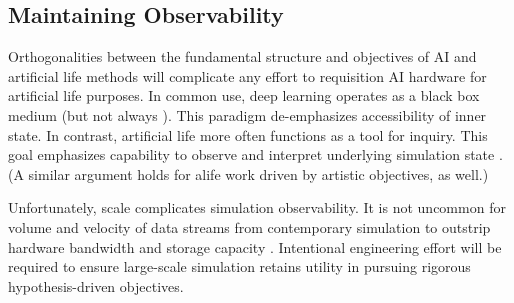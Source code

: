 \subsection{Maintaining Observability}

Orthogonalities between the fundamental structure and objectives of AI and artificial life methods will complicate any effort to requisition AI hardware for artificial life purposes.
In common use, deep learning operates as a black box medium \citep{loyola2019black} (but not always \citep{mahendran2015understanding}).
This paradigm de-emphasizes accessibility of inner state.
In contrast, artificial life more often functions as a tool for inquiry.
This goal emphasizes capability to observe and interpret underlying simulation state \citep{moreno2023toward,horgan1995complexity}.
(A similar argument holds for alife work driven by artistic objectives, as well.)

Unfortunately, scale complicates simulation observability.
It is not uncommon for volume and velocity of data streams from contemporary simulation to outstrip hardware bandwidth and storage capacity \citep{osti_1770192}.
Intentional engineering effort will be required to ensure large-scale simulation retains utility in pursuing rigorous hypothesis-driven objectives.

